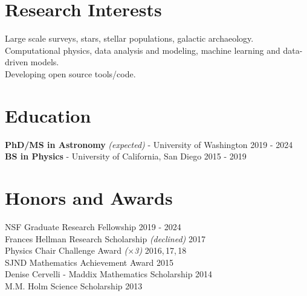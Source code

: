 \documentclass[margin,line]{resume}
\begin{document}
\begin{resume}

\section{\mysidestyle \textcolor{bcolor}{Research Interests}}
Large scale surveys, stars, stellar populations, galactic archaeology. \\
Computational physics, data analysis and modeling, machine learning and data-driven models. \\
Developing open source tools/code.
 
       
\section{\mysidestyle \textcolor{bcolor}{Education}}
\textbf{PhD/MS in Astronomy} \textit{(expected)} - University of Washington  \hfill 2019 - 2024 \\
\textbf{BS in Physics} - University of California, San Diego \hfill 2015 - 2019 
	

 

\section{\mysidestyle \textcolor{bcolor}{Honors and Awards}}
NSF Graduate Research Fellowship \hfill 2019 - 2024 \\
Frances Hellman Research Scholarship \textit{(declined)} \hfill 2017 \\
Physics Chair Challenge Award \textit{($\times$3)} \hfill 2016,\,17,\,18 \\
SJND Mathematics Achievement Award \hfill 2015 \\
Denise Cervelli - Maddix Mathematics Scholarship \hfill 2014 \\
M.M. Holm Science Scholarship \hfill 2013


\end{resume}
\end{document}
